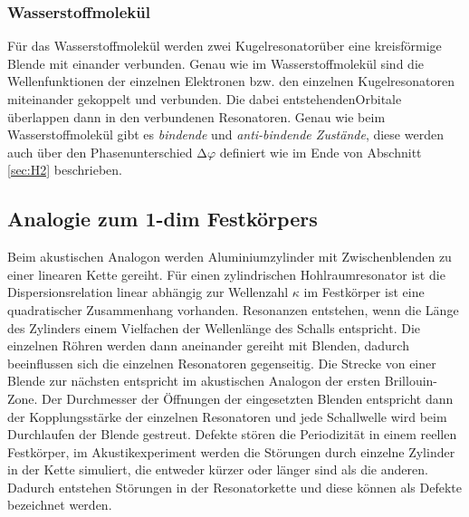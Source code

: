 \subsubsection{Wasserstoffmolekül}
\label{sec:ana-H2}

Für das Wasserstoffmolekül werden zwei Kugelresonatorüber eine kreisförmige Blende mit einander verbunden. Genau wie im Wasserstoffmolekül sind die Wellenfunktionen der einzelnen Elektronen bzw. den einzelnen Kugelresonatoren miteinander gekoppelt und verbunden. Die dabei entstehendenOrbitale überlappen dann in den verbundenen Resonatoren. Genau wie beim Wasserstoffmolekül gibt es \textit{bindende} und \textit{anti-bindende Zustände}, diese werden auch über den Phasenunterschied $\increment \varphi$ definiert wie im Ende von Abschnitt \ref{sec:H2} beschrieben.

\subsection{Analogie zum 1-dim Festkörpers}
\label{ana-fest}

Beim akustischen Analogon werden Aluminiumzylinder mit Zwischenblenden zu einer linearen Kette gereiht. Für einen zylindrischen Hohlraumresonator ist die Dispersionsrelation linear abhängig zur Wellenzahl $\kappa$ im Festkörper ist eine quadratischer Zusammenhang vorhanden. Resonanzen entstehen, wenn die Länge des Zylinders einem Vielfachen der Wellenlänge des Schalls entspricht. Die einzelnen Röhren werden dann aneinander gereiht mit Blenden, dadurch beeinflussen sich die einzelnen Resonatoren gegenseitig. Die Strecke von einer Blende zur nächsten entspricht im akustischen Analogon der ersten Brillouin-Zone. Der Durchmesser der Öffnungen der eingesetzten Blenden entspricht dann der Kopplungsstärke der einzelnen Resonatoren und jede Schallwelle wird beim Durchlaufen der Blende gestreut. Defekte stören die Periodizität in einem reellen Festkörper, im Akustikexperiment werden die Störungen durch einzelne Zylinder in der Kette simuliert, die entweder kürzer oder länger sind als die anderen. Dadurch entstehen Störungen in der Resonatorkette und diese können als Defekte bezeichnet werden.
